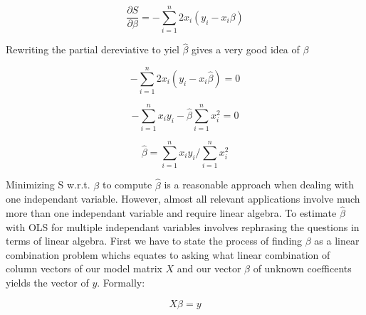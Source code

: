 \documentclass{article}
\begin{document}
    \begin{equation} \label{partialDer} \frac{\partial S}{\partial \beta} = - \sum_{i=1}^{n} 2x_i(y_i-x_i\beta) \end{equation}

    Rewriting the partial dereviative to yiel $\widehat{\beta}$ gives a very good idea of $\beta$

    \begin{equation}  - \sum_{i=1}^{n} 2x_i(y_i-x_i\widehat{\beta}) = 0  \end{equation}

    \begin{equation} - \sum_{i=1}^{n} x_iy_i-\widehat{\beta} \sum_{i=1}^{n} x_i^2 = 0  \end{equation}

    \begin{equation} \widehat{\beta} = \sum_{i=1}^{n} x_iy_i /\sum_{i=1}^{n} x_i^2 \end{equation}


    Minimizing S w.r.t. $\beta$ to compute $\widehat{\beta}$ is a reasonable approach when dealing with one independant variable. However, almost all relevant applications involve much more than one independant variable and require linear algebra. To estimate $\widehat{\beta}$ with OLS for multiple independant variables involves rephrasing the questions in terms of linear algebra. First we have to state the process of finding $\beta$ as a linear combination problem whichs equates to asking what linear combination of column vectors of our model matrix $X$ and our vector $\beta$ of unknown coefficents yields the vector of $y$. Formally:

    \begin{equation} \label{matrix} X\beta = y \end{equation}
\end{document}
